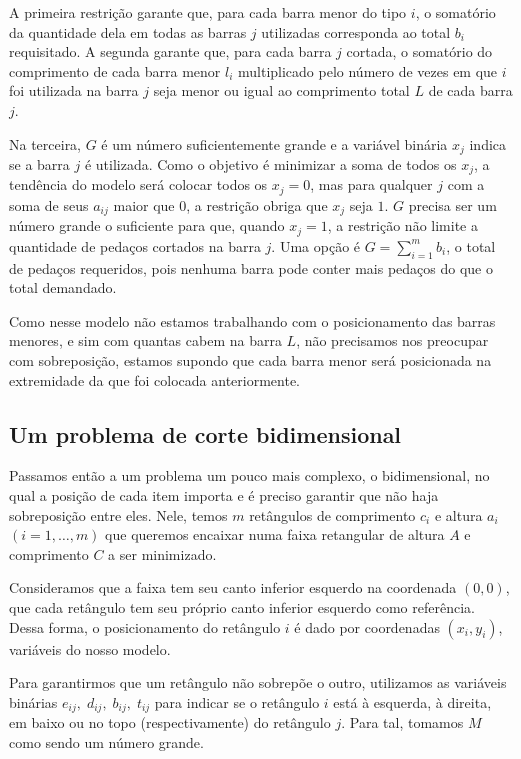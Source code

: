 \documentclass{article}
\begin{document}
A primeira restrição garante que, para cada barra menor do tipo $i$, o somatório da quantidade dela em todas as barras $j$ utilizadas corresponda ao total $b_i$ requisitado. A segunda garante que, para cada barra $j$ cortada, o somatório do comprimento de cada barra menor $l_i$ multiplicado pelo número de vezes em que $i$ foi utilizada na barra $j$ seja menor ou igual ao comprimento total $L$ de cada barra $j$.

Na terceira, $G$ é um número suficientemente grande e a variável binária $x_j$ indica se a barra $j$ é utilizada. Como o objetivo é minimizar a soma de todos os $x_j$, a tendência do modelo será colocar todos os $x_j = 0$, mas para qualquer $j$ com a soma de seus $a_{ij}$ maior que $0$, a restrição obriga que $x_j$ seja $1$. $G$ precisa ser um número grande o suficiente para que, quando $x_j = 1$, a restrição não limite a quantidade de pedaços cortados na barra $j$. Uma opção é $G = \sum_{i=1}^m b_i$, o total de pedaços requeridos, pois nenhuma barra pode conter mais pedaços do que o total demandado.

Como nesse modelo não estamos trabalhando com o posicionamento das barras menores, e sim com quantas cabem na barra $L$, não precisamos nos preocupar com sobreposição, estamos supondo que cada barra menor será posicionada na extremidade da que foi colocada anteriormente.

\subsection{Um problema de corte bidimensional}

Passamos então a um problema um pouco mais complexo, o bidimensional, no qual a posição de cada item importa e é preciso garantir que não haja sobreposição entre eles. Nele, temos $m$ retângulos de comprimento $c_i$ e altura $a_i$ $(i=1, \dots, m)$ que queremos encaixar numa faixa retangular de altura $A$ e comprimento $C$ a ser minimizado.

Consideramos que a faixa tem seu canto inferior esquerdo na coordenada $(0,0)$, que cada retângulo tem seu próprio canto inferior esquerdo como referência. Dessa forma, o posicionamento do retângulo $i$ é dado por coordenadas $(x_i, y_i)$, variáveis do nosso modelo.

Para garantirmos que um retângulo não sobrepõe o outro, utilizamos as variáveis binárias $e_{ij},\; d_{ij}, \; b_{ij}, \;t_{ij}$ para indicar se o retângulo $i$ está à esquerda, à direita, em baixo ou no topo (respectivamente) do retângulo $j$. Para tal, tomamos $M$ como sendo um número grande. 
\end{document}
